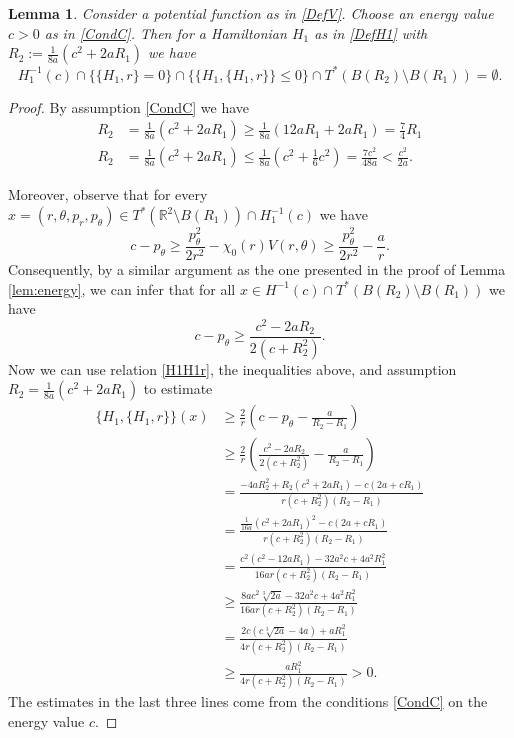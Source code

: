 \documentclass[a4paper]{amsart}
\newtheorem{lem}[thm]{Lemma}%
\numberwithin{equation}{section}
\newcommand{\R}{\mathbb{R}}
\begin{document}
\begin{lem}\label{lem:noMax}
Consider a potential function as in \eqref{DefV}. Choose an energy value $c> 0$ as in \eqref{CondC}.
Then for a Hamiltonian $H_1$ as in \eqref{DefH1} with $R_2:= \frac{1}{8a}\left( c^2+2aR_1\right)$ we have
$$
H_1^{-1}(c)\cap\{\{H_1,r\}=0\}\cap \{\{H_1,\{H_1,r\}\}\leq 0\}\cap T^*(B(R_2)\setminus B(R_1))=\emptyset.
$$
\end{lem}
\begin{proof}
By assumption \eqref{CondC} we have
\begin{align}
R_2 & = \frac{1}{8a}\left( c^2+2aR_1\right) \geq \frac{1}{8a}\left( 12aR_1+2aR_1\right)=\frac{7}{4} R_1 \nonumber\\
R_2 & = \frac{1}{8a}\left( c^2+2aR_1\right)\leq\frac{1}{8a}\left( c^2+\frac{1}{6}c^2\right)=\frac{7c^2}{48 a}<\frac{c^2}{2a}.\label{R2small}
\end{align}

Moreover, observe that for every $x=(r,\theta, p_r, p_\theta) \in T^*(\R^2\setminus B(R_1))\cap H_1^{-1}(c)$ we have
$$
c-p_\theta \geq \frac{p_\theta^2}{2 r^2}-\chi_0(r)V(r,\theta)\geq \frac{p_\theta^2}{2 r^2}-\frac{a}{r}.
$$
Consequently, by a similar argument as the one presented in the proof of Lemma \ref{lem:energy}, we can infer that for all $x\in H^{-1}(c)\cap T^*(B(R_2)\setminus B(R_1))$ we have
$$
c-p_\theta \geq \frac{c^2-2aR_2}{2(c+R_2^2)}.
$$
Now we can use relation \eqref{H1H1r}, the inequalities above, and assumption\linebreak $R_2=\frac{1}{8a}\left( c^2+2aR_1\right)$ to estimate
\begin{align*}
\{H_1, \{H_1, r\}\}(x) & \geq  \frac{2}{r}\left( c-p_\theta-\frac{a}{R_2-R_1}\right)\\
& \geq \frac{2}{r}\left(\frac{c^2-2aR_2}{2(c+R_2^2)}-\frac{a}{R_2-R_1}\right)\\
& = \frac{-4a R_2^2+R_2(c^2+2aR_1)-c(2a+cR_1)}{r(c+R_2^2)(R_2-R_1)}\\
& = \frac{\frac{1}{16a}\left( c^2+2aR_1\right)^2-c(2a+cR_1)}{r(c+R_2^2)(R_2-R_1)}\\
& = \frac{c^2\left(c^2-12aR_1\right)-32a^2c+4a^2R_1^2}{16ar(c+R_2^2)(R_2-R_1)}\\
& \geq \frac{8ac^2\sqrt[3]{2a}-32a^2c+4a^2R_1^2}{16ar(c+R_2^2)(R_2-R_1)}\\
& = \frac{2c\left(c\sqrt[3]{2a}-4a\right)+aR_1^2}{4r(c+R_2^2)(R_2-R_1)}\\
& \geq \frac{aR_1^2}{4r(c+R_2^2)(R_2-R_1)}>0.
\end{align*}
The estimates in the last three lines come from the conditions \eqref{CondC} on the energy value $c$.
\end{proof}
\end{document}
